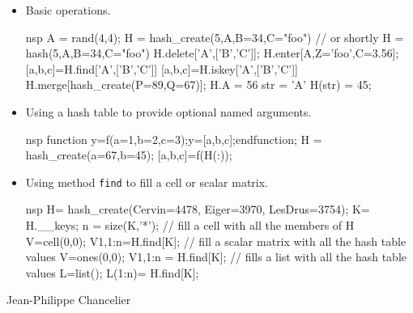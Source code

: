 \begin{examples}
\begin{itemize}
\item Basic operations.
\begin{mintednsp}{nsp}
 A = rand(4,4);
 H = hash_create(5,A,B=34,C="foo")  
 // or shortly H = hash(5,A,B=34,C="foo")
 H.delete['A',['B','C']];
 H.enter[A,Z='foo',C=3.56];
 [a,b,c]=H.find['A',['B','C']]
 [a,b,c]=H.iskey['A',['B','C']]
 H.merge[hash_create(P=89,Q=67)];
 H.A = 56 
 str = 'A'
 H(str) = 45;
\end{mintednsp}
\item Using a hash table to provide optional named arguments.
\begin{mintednsp}{nsp}
 function y=f(a=1,b=2,c=3);y=[a,b,c];endfunction;
 H = hash_create(a=67,b=45);
 [a,b,c]=f(H(:));
\end{mintednsp}
\item Using method \verb+find+ to fill a cell or scalar matrix.
\begin{mintednsp}{nsp}
  H= hash_create(Cervin=4478, Eiger=3970, LesDrus=3754);
  K= H.__keys;
  n = size(K,'*');
  // fill a cell with all the members of H
  V=cell(0,0);
  V{1,1:n}=H.find[K];
  // fill a scalar matrix with all the hash table values 
  V=ones(0,0);
  V{1,1:n} = H.find[K];
  // fills a list with all the hash table values 
  L=list();
  L(1:n)= H.find[K];
\end{mintednsp}
\end{itemize}
\end{examples}

\begin{authors}
  Jean-Philippe Chancelier
\end{authors}
